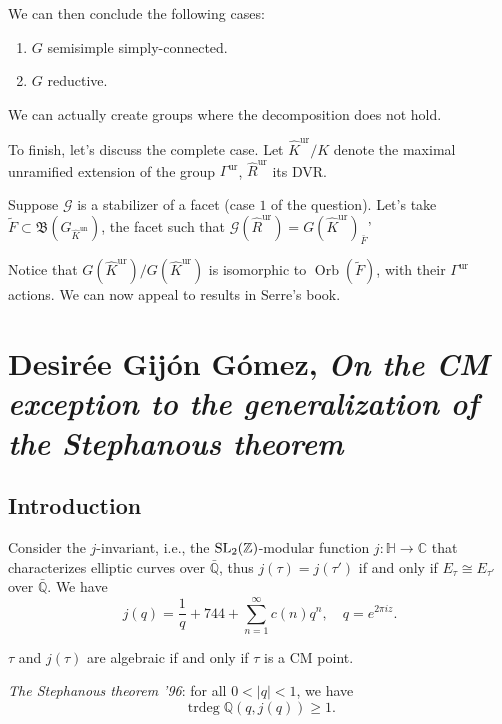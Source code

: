 \documentclass[reqno]{amsart} 
\numberwithin{theorem}{section}
\numberwithin{equation}{section}
\begin{document}
We can then conclude the following cases:
\begin{enumerate}
\item $G$ semisimple simply-connected.
\item $G$ reductive.
\end{enumerate}
We can actually create groups where the decomposition does not hold.

To finish, let's discuss the complete case.  Let $\hat{K}^{\mathrm{ur}} / K$ denote the maximal unramified extension of the group $\Gamma^{\mathrm{ur}}$, $\hat{R}^{\mathrm{ur}}$ its DVR.

Suppose $\mathcal{G}$ is a stabilizer of a facet (case $1$ of the question).  Let's take $\tilde{F} \subset \mathfrak{B}(G_{\hat{K}^{\mathrm{un}}})$, the facet such that $\mathcal{G}(\hat{R}^{\mathrm{ur}}) = G(\hat{K}^{\mathrm{ur}})_{\bar{F}}$'

Notice that $G(\hat{K}^{\mathrm{ur}}) / G(\hat{K}^{\mathrm{ur}})$ is isomorphic to $\operatorname{Orb}(\tilde{F})$, with their $\Gamma^{\mathrm{ur}}$ actions.  We can now appeal to results in Serre's book.

\section{Desirée Gijón Gómez, \emph{On the CM exception to the generalization of the Stephanous theorem}}

\subsection{Introduction}

Consider the $j$-invariant, i.e., the $\operatorname{SL}_2(\mathbb{Z})$-modular function $j : \mathbb{H} \rightarrow \mathbb{C}$ that characterizes elliptic curves over $\bar{\mathbb{Q}}$, thus $j(\tau) = j(\tau ')$ if and only if $E_\tau \cong E_{\tau '}$ over $\bar{\mathbb{Q}}$.  We have
\begin{equation*}
  j(q) = \frac{1}{q} + 744 + \sum_{n = 1}^\infty c(n) q^n,
  \quad
  q = e^{2 \pi i z}.
\end{equation*}

\begin{theorem}[Schneider '37]
  $\tau$ and $j(\tau)$ are algebraic if and only if $\tau$ is a CM point.
\end{theorem}

\emph{The Stephanous theorem '96}: for all $0 < \lvert q \rvert < 1$, we have
\begin{equation*}
  \operatorname{trdeg} \mathbb{Q}(q, j(q)) \geq 1.
\end{equation*}
\end{document}
